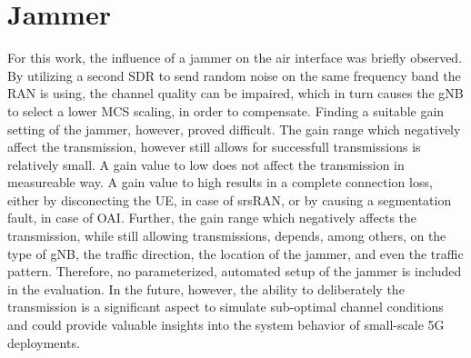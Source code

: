 \section{Jammer}\label{sec:future:jammer}
For this work, the influence of a jammer on the air interface was briefly observed.
By utilizing a second \gls{SDR} to send random noise on the same frequency band the \gls{RAN} is using, the channel quality can be impaired,
which in turn causes the \gls{gNB} to select a lower \gls{MCS} scaling, in order to compensate.
Finding a suitable gain setting of the jammer, however, proved difficult.
The gain range which negatively affect the transmission, however still allows for successfull transmissions is relatively small.
A gain value to low does not affect the transmission in measureable way.
A gain value to high results in a complete connection loss, either by disconecting the \gls{UE}, in case of srsRAN, or by
causing a segmentation fault, in case of OAI.
Further, the gain range which negatively affects the transmission, while still allowing transmissions, depends,
among others, on the type of \gls{gNB}, the traffic direction, the location of the jammer, and even the traffic pattern.
Therefore, no parameterized, automated setup of the jammer is included in the evaluation.
In the future, however, the ability to deliberately  the transmission is a significant aspect to
simulate sub-optimal channel conditions and could provide valuable
insights into the system behavior of small-scale 5G deployments.
